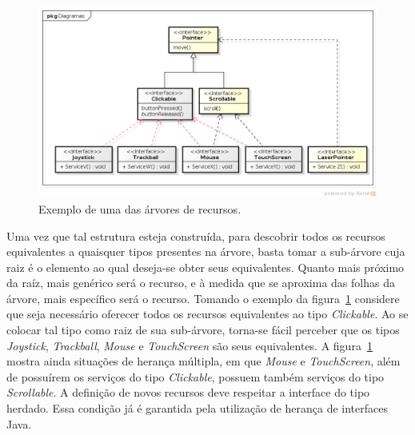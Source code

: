 \begin{figure}[ht]
	\center
	\includegraphics[scale=0.55]{imagens/arvoreDeRecursos}
	\caption{Exemplo de uma das árvores de recursos.}
	\label{fig:arvoreDeRecursos}
\end{figure}

Uma vez que tal estrutura esteja construída, para descobrir todos os recursos equivalentes a quaisquer tipos presentes na árvore, basta tomar a sub-árvore cuja raiz é o elemento ao qual deseja-se obter seus equivalentes. Quanto mais próximo da raíz, mais genérico será o recurso, e à medida que se aproxima das folhas da árvore, mais específico será o recurso. Tomando o exemplo da figura~\ref{fig:arvoreDeRecursos} considere que seja necessário oferecer todos os recursos equivalentes ao tipo \emph{Clickable}. Ao se colocar tal tipo como raiz de sua sub-árvore, torna-se fácil perceber que os tipos \emph{Joystick}, \emph{Trackball}, \emph{Mouse} e \emph{TouchScreen} são seus equivalentes. A figura~\ref{fig:arvoreDeRecursos} mostra ainda situações de herança múltipla, em que \emph{Mouse} e \emph{TouchScreen}, além de possuírem os serviços do tipo \emph{Clickable}, possuem também serviços do tipo \emph{Scrollable}. A definição de novos recursos deve respeitar a interface do tipo herdado. Essa condição já é garantida pela utilização de herança de interfaces Java.
